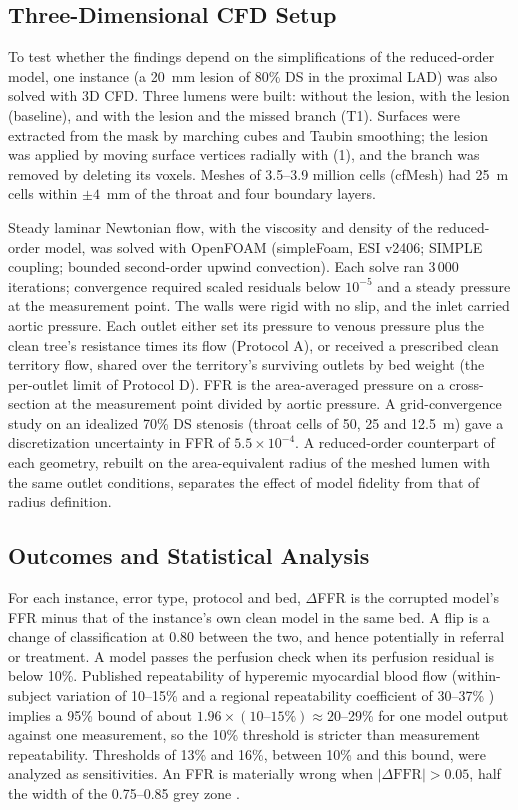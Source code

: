 \documentclass[journal,twoside,web]{ieeecolor}
\begin{document}
\subsection{Three-Dimensional CFD Setup}
To test whether the findings depend on the simplifications of the reduced-order model, one instance (a 20~mm lesion
of 80\% DS in the proximal LAD) was also solved with 3D CFD. Three lumens were built: without the lesion, with the lesion (baseline), and with the
lesion and the missed branch (T1). Surfaces were extracted from the mask by marching cubes and Taubin smoothing; the
lesion was applied by moving surface vertices radially with (1), and the branch was removed by deleting its voxels.
Meshes of 3.5--3.9 million cells (cfMesh) had 25~\textmu m cells within $\pm 4$~mm of the throat and four boundary
layers.

Steady laminar Newtonian flow, with the viscosity and density of the reduced-order model, was solved with OpenFOAM
(simpleFoam, ESI v2406; SIMPLE coupling; bounded second-order upwind convection). Each solve ran
3\,000 iterations; convergence required scaled residuals below $10^{-5}$ and a steady pressure at the measurement
point. The walls were rigid with no slip, and the inlet carried aortic pressure. Each outlet either set its pressure
to venous pressure plus the clean tree's resistance times its flow (Protocol A), or received a prescribed clean
territory flow, shared over the territory's surviving outlets by bed weight (the per-outlet limit of Protocol D). FFR
is the area-averaged pressure on a cross-section at the measurement point divided by aortic pressure. A
grid-convergence study on an idealized 70\% DS stenosis (throat cells of 50, 25 and 12.5~\textmu m) gave a
discretization uncertainty in FFR of $5.5\times10^{-4}$. A reduced-order counterpart of each geometry, rebuilt on the
area-equivalent radius of the meshed lumen with the same outlet conditions, separates the effect of model fidelity
from that of radius definition.

\subsection{Outcomes and Statistical Analysis}
For each instance, error type, protocol and bed, $\Delta$FFR is the corrupted model's FFR minus that of the
instance's own clean model in the same bed. A flip is a change of classification at 0.80 between the two, and hence potentially
in referral or treatment. A model passes the perfusion check when its perfusion residual is below 10\%.
Published repeatability of hyperemic myocardial blood flow (within-subject variation of 10--15\%
\cite{schindler2023} and a regional repeatability coefficient of 30--37\% \cite{brown2018}) implies a 95\% bound of
about $1.96 \times (10\text{--}15\%) \approx 20$--29\% for one model output against one measurement, so the 10\% threshold is stricter than measurement repeatability. Thresholds of 13\% and 16\%, between 10\% and this bound, were analyzed as
sensitivities. An FFR is materially wrong when $|\Delta\mathrm{FFR}| > 0.05$, half the width of the 0.75--0.85 grey zone
\cite{petraco2013}.
\end{document}
